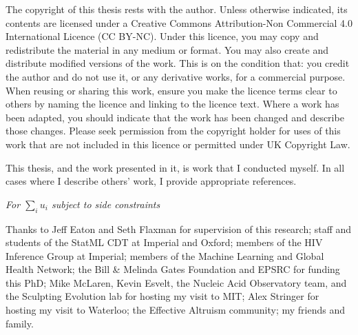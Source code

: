 \documentclass[a4paper, nobind]{templates/ociamthesis}
\begin{document}
\setcounter{secnumdepth}{2}
\setcounter{tocdepth}{1}



\begin{romanpages}

\maketitle

\begin{copyrights}
  The copyright of this thesis rests with the author. Unless otherwise indicated, its contents are licensed under a Creative Commons Attribution-Non Commercial 4.0 International Licence (CC BY-NC).
  Under this licence, you may copy and redistribute the material in any medium or format. You may also create and distribute modified versions of the work.
  This is on the condition that: you credit the author and do not use it, or any derivative works, for a commercial purpose.
  When reusing or sharing this work, ensure you make the licence terms clear to others by naming the licence and linking to the licence text.
  Where a work has been adapted, you should indicate that the work has been changed and describe those changes.
  Please seek permission from the copyright holder for uses of this work that are not included in this licence or permitted under UK Copyright Law.
\end{copyrights}

\begin{originality}
  This thesis, and the work presented in it, is work that I conducted myself.
  In all cases where I describe others' work, I provide appropriate references.
\end{originality}

\begin{dedication}
  \textit{For $\sum_i u_i$ subject to side constraints}
\end{dedication}

\begin{acknowledgements}
 	Thanks to Jeff Eaton and Seth Flaxman for supervision of this research;
 staff and students of the StatML CDT at Imperial and Oxford;
 members of the HIV Inference Group at Imperial;
 members of the Machine Learning and Global Health Network;
 the Bill \& Melinda Gates Foundation and EPSRC for funding this PhD;
 Mike McLaren, Kevin Esvelt, the Nucleic Acid Observatory team, and the Sculpting Evolution lab for hosting my visit to MIT;
 Alex Stringer for hosting my visit to Waterloo;
 the Effective Altruism community;
 my friends and family.


\end{acknowledgements}
\end{romanpages}
\end{document}
